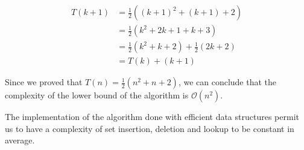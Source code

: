 \begin{align}
    T(k+1)&=\frac{1}{2}((k+1)^2+(k+1)+2)\\
    &=\frac{1}{2}(k^2+2k+1+k+3)\\
    &=\frac{1}{2}(k^2+k+2)+\frac{1}{2}(2k+2)\\
    &=T(k)+(k+1)
\end{align}

Since we proved that $T(n)=\frac{1}{2}(n^2+n+2)$, we can conclude that the complexity
of the lower bound of the algorithm is $\mathcal{O}(n^2)$. \newline

The implementation of the algorithm done with efficient data structures permit us
to have a complexity of set insertion, deletion and lookup to be constant in average.
